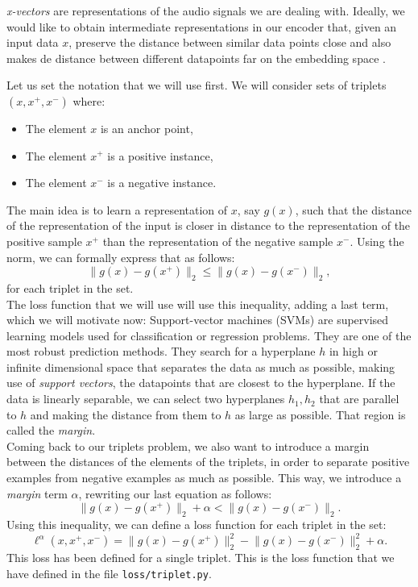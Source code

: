 \documentclass[a4paper]{article}
\newcommand{\norm}[1]{\lVert #1 \rVert}
\def\inline{\lstinline[basicstyle=\ttfamily,keywordstyle={}]}
\newcommand{\ps}{x^+}
\newcommand{\ns}{x^-}
\begin{document}
\emph{x-vectors} are representations of the audio signals we are dealing with. Ideally, we would like to obtain intermediate representations in our encoder that, given an input data $x$, preserve the distance between similar data points close and also makes de distance between different datapoints far on the embedding space \cite{Sohn2016ImprovedDM}.

Let us set the notation that we will use first. We will consider sets of triplets $(x,\ps,\ns)$ where:
\begin{itemize}
\item The element $x$ is an anchor point,
\item The element $\ps$ is a positive instance,
\item The element $\ns$ is a negative instance.
\end{itemize}

The main idea is to learn a representation of $x$, say $g(x)$, such that the distance of the representation of the input is closer in distance to the representation of the positive sample $\ps$ than the representation of the negative sample $\ns$. Using the norm, we can formally express that as follows:
$$
\norm{g(x) - g(\ps)}_2 \leq \norm{g(x) - g(\ns)}_2,
$$
for each triplet in the set.\\

The loss function that we will use will use this inequality, adding a last term, which we will motivate now: Support-vector machines (SVMs) are supervised learning models used for classification or regression problems. They are one of the most robust prediction methods. They search for a hyperplane $h$ in high or infinite dimensional space that separates the data as much as possible, making use of \emph{support vectors}, the datapoints that are closest to the hyperplane. If the data is linearly separable, we can select two hyperplanes $h_1,h_2$ that are parallel to $h$ and making the distance from them to $h$ as large as possible. That region is called the \emph{margin}.\\

Coming back to our triplets problem, we also want to introduce a margin between the distances of the elements of the triplets, in order to separate positive examples from negative examples as much as possible. This way, we introduce a \emph{margin} term $\alpha$, rewriting our last equation as follows:
\[
\norm{g(x) - g(\ps)}_2 + \alpha < \norm{g(x) - g(\ns)}_2.
\]
Using this inequality, we can define a loss function for each triplet in the set:
\begin{equation}\label{triplet:single:loss}
\ell^\alpha (x,\ps,\ns) =  \norm{g(x) - g(\ps)}_2^2 - \norm{g(x) - g(\ns)}_2^2 + \alpha.
\end{equation}
This loss has been defined for a single triplet. This is the loss function that we have defined in the file \inline{loss/triplet.py}.


\printbibliography
\end{document}

